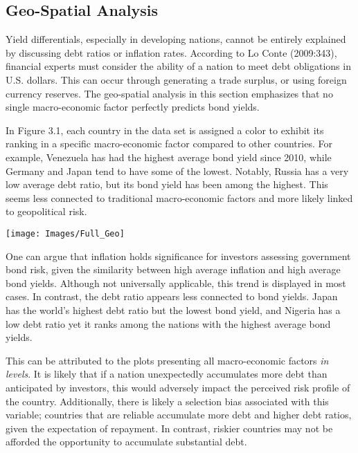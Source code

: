 \documentclass[11pt,preprint, authoryear]{elsarticle}
\let\origfigure\figure
\let\endorigfigure\endfigure
\renewenvironment{figure}[1][2] {
    \expandafter\origfigure\expandafter[H]
} {
    \endorigfigure
}
\numberwithin{equation}{section}
\numberwithin{figure}{section}
\numberwithin{table}{section}
\begin{document}
\hypertarget{geo-spatial-analysis}{%
\subsection{Geo-Spatial Analysis}\label{geo-spatial-analysis}}

Yield differentials, especially in developing nations, cannot be
entirely explained by discussing debt ratios or inflation rates.
According to Lo Conte (2009:343), financial experts must consider the
ability of a nation to meet debt obligations in U.S. dollars. This can
occur through generating a trade surplus, or using foreign currency
reserves. The geo-spatial analysis in this section emphasizes that no
single macro-economic factor perfectly predicts bond yields.

In Figure 3.1, each country in the data set is assigned a color to
exhibit its ranking in a specific macro-economic factor compared to
other countries. For example, Venezuela has had the highest average bond
yield since 2010, while Germany and Japan tend to have some of the
lowest. Notably, Russia has a very low average debt ratio, but its bond
yield has been among the highest. This seems less connected to
traditional macro-economic factors and more likely linked to
geopolitical risk.

\begin{figure}

{\centering \texttt{[image: Images/Full\_Geo]} 

}

\caption{Average Macro-economic Indicators Since 2010 \label{Figure3.1}}\label{fig:unnamed-chunk-2}
\end{figure}

One can argue that inflation holds significance for investors assessing
government bond risk, given the similarity between high average
inflation and high average bond yields. Although not universally
applicable, this trend is displayed in most cases. In contrast, the debt
ratio appears less connected to bond yields. Japan has the world's
highest debt ratio but the lowest bond yield, and Nigeria has a low debt
ratio yet it ranks among the nations with the highest average bond
yields.

This can be attributed to the plots presenting all macro-economic
factors \emph{in levels}. It is likely that if a nation unexpectedly
accumulates more debt than anticipated by investors, this would
adversely impact the perceived risk profile of the country.
Additionally, there is likely a selection bias associated with this
variable; countries that are reliable accumulate more debt and higher
debt ratios, given the expectation of repayment. In contrast, riskier
countries may not be afforded the opportunity to accumulate substantial
debt.
\end{document}
